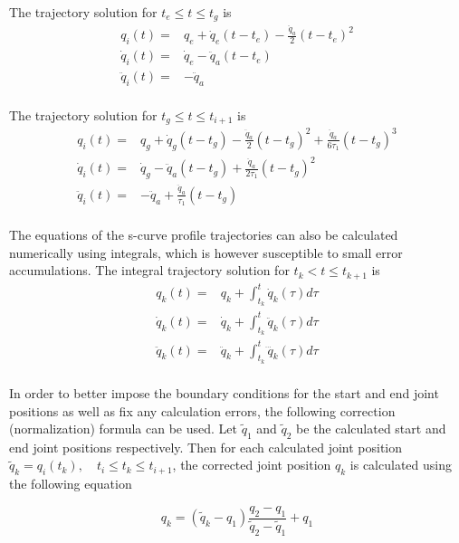 The trajectory solution for $t_e \leq t \leq t_g$ is
\begin{equation}
\begin{aligned}
q_i(t) ={}& q_e + \dot{q}_e(t-t_e) - \frac{\ddot{q}_a}{2}(t-t_e)^2 \\
\dot{q}_i(t) ={}& \dot{q}_e - \ddot{q}_a(t-t_e) \\
\ddot{q}_i(t) ={}& -\ddot{q}_a \\
\end{aligned}
\end{equation}

The trajectory solution for $t_g \leq t \leq t_{i+1}$ is
\begin{equation}
\begin{aligned}
q_i(t) ={}& q_g + \dot{q}_g(t-t_g) - \frac{\ddot{q}_a}{2}(t-t_g)^2 + \frac{\ddot{q}_a}{6τ_1}(t-t_g)^3 \\
\dot{q}_i(t) ={}& \dot{q}_g - \ddot{q}_a(t-t_g) + \frac{\ddot{q}_a}{2τ_1}(t-t_g)^2 \\
\ddot{q}_i(t) ={}& -\ddot{q}_a + \frac{\ddot{q}_a}{τ_1}(t-t_g) \\
\end{aligned}
\end{equation}

The equations of the s-curve profile trajectories can also be calculated numerically using integrals, which is however susceptible to small error accumulations. The integral trajectory solution for 
$t_k < t \leq t_{k+1}$ is
\begin{equation}
\begin{aligned}
q_k(t) ={}& q_k + \int_{t_k}^t \dot{q}_k(τ)dτ \\
\dot{q}_k(t) ={}& \dot{q}_k + \int_{t_k}^t \ddot{q}_k(τ)dτ \\
\ddot{q}_k(t) ={}& \ddot{q}_k + \int_{t_k}^t \dddot{q}_k(τ)dτ \\
\end{aligned}
\end{equation}

In order to better impose the boundary conditions for the start and end joint positions as well as fix any calculation errors, the following correction (normalization) formula can be used. 
Let $\tilde{q}_1$ and $\tilde{q}_2$ be the calculated start and end joint positions respectively. Then for each calculated joint position $\tilde{q}_k = q_i(t_k), \quad t_i \leq t_k \leq t_{i+1}$, 
the corrected joint position $q_k$ is calculated using the following equation

\begin{equation}
q_k = (\tilde{q}_k - q_1) \frac{q_2 - q_1}{\tilde{q}_2 - \tilde{q}_1} + q_1
\end{equation}



